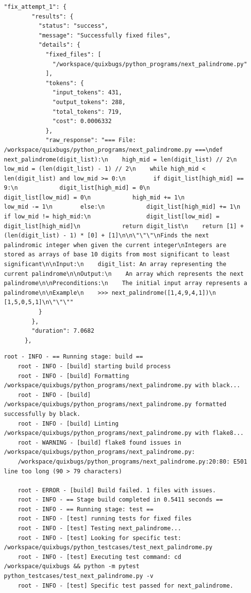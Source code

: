 \begin{lstlisting}[style=json, caption={Fix generation log excerpt}, label={fig:fix}]
    "fix_attempt_1": {
        "results": {
          "status": "success",
          "message": "Successfully fixed files",
          "details": {
            "fixed_files": [
              "/workspace/quixbugs/python_programs/next_palindrome.py"
            ],
            "tokens": {
              "input_tokens": 431,
              "output_tokens": 288,
              "total_tokens": 719,
              "cost": 0.0006332
            },
            "raw_response": "=== File: /workspace/quixbugs/python_programs/next_palindrome.py ===\ndef next_palindrome(digit_list):\n    high_mid = len(digit_list) // 2\n    low_mid = (len(digit_list) - 1) // 2\n    while high_mid < len(digit_list) and low_mid >= 0:\n        if digit_list[high_mid] == 9:\n            digit_list[high_mid] = 0\n            digit_list[low_mid] = 0\n            high_mid += 1\n            low_mid -= 1\n        else:\n            digit_list[high_mid] += 1\n            if low_mid != high_mid:\n                digit_list[low_mid] = digit_list[high_mid]\n            return digit_list\n    return [1] + (len(digit_list) - 1) * [0] + [1]\n\n\"\"\"\nFinds the next palindromic integer when given the current integer\nIntegers are stored as arrays of base 10 digits from most significant to least significant\n\nInput:\n    digit_list: An array representing the current palindrome\n\nOutput:\n    An array which represents the next palindrome\n\nPreconditions:\n    The initial input array represents a palindrome\n\nExample\n    >>> next_palindrome([1,4,9,4,1])\n    [1,5,0,5,1]\n\"\"\""
          }
        },
        "duration": 7.0682
      },
\end{lstlisting}

\begin{lstlisting}[style=log, caption={Change validation log excerpt}, label={fig:validation}]
    root - INFO - == Running stage: build ==
    root - INFO - [build] starting build process 
    root - INFO - [build] Formatting /workspace/quixbugs/python_programs/next_palindrome.py with black...
    root - INFO - [build] /workspace/quixbugs/python_programs/next_palindrome.py formatted successfully by black.
    root - INFO - [build] Linting /workspace/quixbugs/python_programs/next_palindrome.py with flake8...
    root - WARNING - [build] flake8 found issues in /workspace/quixbugs/python_programs/next_palindrome.py:
    /workspace/quixbugs/python_programs/next_palindrome.py:20:80: E501 line too long (90 > 79 characters)
    
    root - ERROR - [build] Build failed. 1 files with issues.
    root - INFO - == Stage build completed in 0.5411 seconds ==
    root - INFO - == Running stage: test ==
    root - INFO - [test] running tests for fixed files
    root - INFO - [test] Testing next_palindrome...
    root - INFO - [test] Looking for specific test: /workspace/quixbugs/python_testcases/test_next_palindrome.py
    root - INFO - [test] Executing test command: cd /workspace/quixbugs && python -m pytest python_testcases/test_next_palindrome.py -v
    root - INFO - [test] Specific test passed for next_palindrome.
\end{lstlisting}

